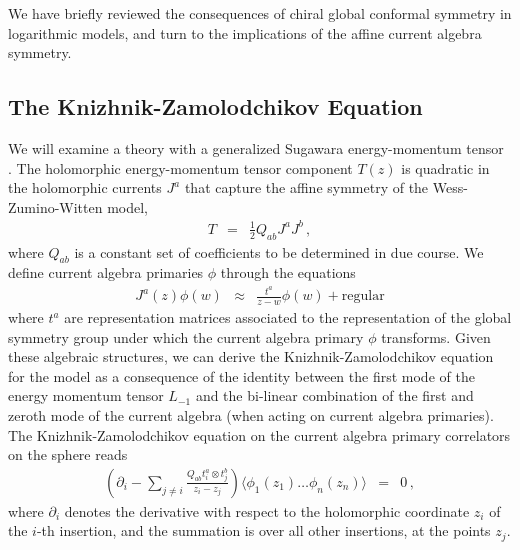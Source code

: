\documentclass[12pt]{article}
\numberwithin{equation}{section}
\numberwithin{equation}{section}
\numberwithin{table}{section}\setlength{\multlinegap}{25pt}
\begin{document}
We have briefly reviewed the consequences of chiral global conformal symmetry
in logarithmic models, and turn to the implications of the affine current
algebra symmetry.


\subsection{The Knizhnik-Zamolodchikov Equation}
We will examine a theory with a generalized Sugawara energy-momentum tensor \cite{Rozansky:1992rx}. The holomorphic
energy-momentum tensor component $T(z)$ is quadratic in the holomorphic currents $J^a$ that capture the affine
symmetry of the Wess-Zumino-Witten model, 
\begin{eqnarray}
T &=& \frac{1}{2} Q_{ab} J^a J^b \, , \label{TQ}
\end{eqnarray}
where $Q_{ab}$ is a constant set of coefficients to be determined in due course.
We define current algebra primaries $\phi$
through the equations
\begin{eqnarray}
J^a(z) \phi(w) & \approx &  \frac{t^a}{z-w} \phi(w) + \mbox{regular}  \label{currentprimary}
\end{eqnarray}
where $t^a$ are representation matrices associated to the representation of the global symmetry
group under which the current algebra primary $\phi$ transforms. Given these algebraic structures, we can derive the Knizhnik-Zamolodchikov equation
for the model as a consequence of the identity between the first mode of the energy momentum tensor $L_{-1}$
and the bi-linear combination of the first and zeroth mode of the current algebra \cite{Knizhnik:1984nr} (when acting on current algebra primaries).
The Knizhnik-Zamolodchikov equation on the current algebra primary correlators on the sphere reads
\begin{eqnarray}
(\partial_i - \sum_{j \neq i} \frac{ Q_{ab} t^a_i \otimes t^b_j}{z_i-z_j})
\langle \phi_1(z_1) \dots \phi_n(z_n) \rangle &=& 0 \, , \label{KZ}
\end{eqnarray}
where $\partial_i$ denotes the derivative with respect to the holomorphic coordinate $z_i$ of 
the $i$-th insertion, and the summation is over all other insertions, at the points $z_j$.
\end{document}
